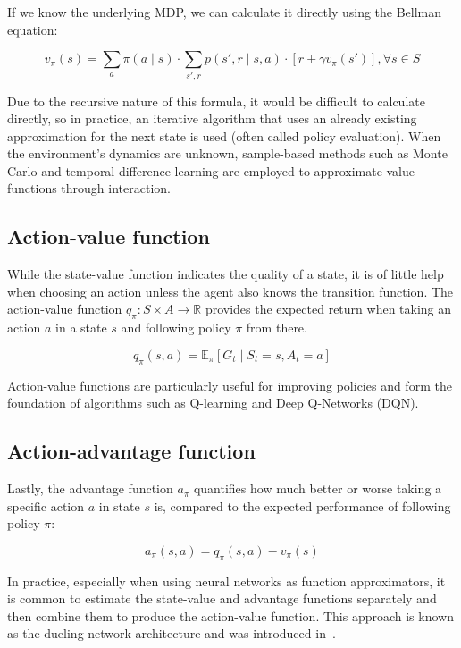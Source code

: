 \documentclass[
  digital,     %
  oneside,     %
  nosansbold,  %
  nocolorbold, %
  lof,         %
  lot,         %
]{fithesis4}
\begin{document}
If we know the underlying MDP, we can calculate it directly using the Bellman equation:

\begin{equation}
v_\pi(s) = \sum_a \pi(a\mid s) \cdot \sum_{s',r} p(s',r\mid s,a)\cdot[r+\gamma v_\pi(s')], \forall s \in S
\end{equation}

Due to the recursive nature of this formula, it would be difficult to calculate directly, so in practice, an iterative algorithm that uses an already existing approximation for the next state is used (often called policy evaluation). When the environment's dynamics are unknown, sample-based methods such as Monte Carlo and temporal-difference learning are employed to approximate value functions through interaction.

\subsection{Action-value function}

While the state-value function indicates the quality of a state, it is of little help when choosing an action unless the agent also knows the transition function. The action-value function $q_\pi\colon S \times A \to \mathbb{R}$ provides the expected return when taking an action $a$ in a state $s$ and following policy $\pi$ from there.

\begin{equation}
q_\pi(s,a) = \mathbb{E}_\pi [G_t\mid S_t=s,A_t=a]
\end{equation}

Action-value functions are particularly useful for improving policies and form the foundation of algorithms such as Q-learning and Deep Q-Networks (DQN).

\subsection{Action-advantage function}

Lastly, the advantage function $a_\pi$ quantifies how much better or worse taking a specific action $a$ in state $s$ is, compared to the expected performance of following policy $\pi$:

\begin{equation}
a_\pi(s,a) = q_\pi(s,a)-v_\pi(s)
\end{equation}

In practice, especially when using neural networks as function approximators, it is common to estimate the state-value and advantage functions separately and then combine them to produce the action-value function. This approach is known as the dueling network architecture and was introduced in~\cite{dueling_arch}.
\end{document}
